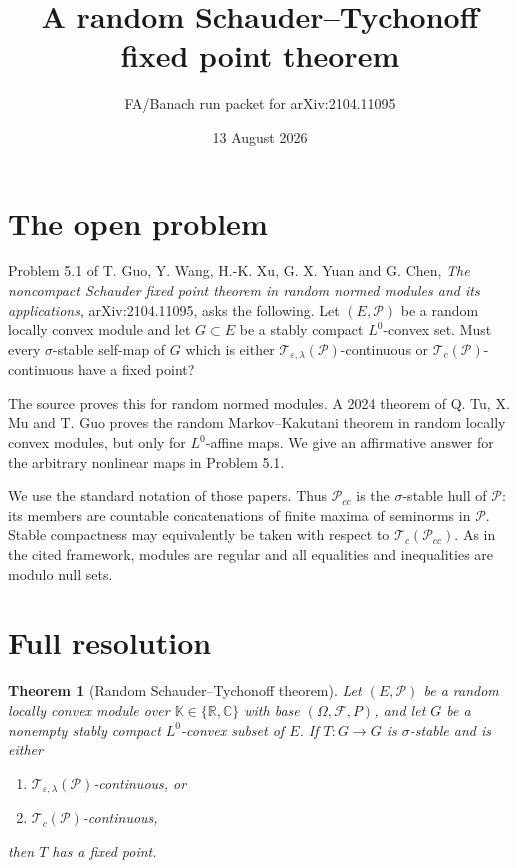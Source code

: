 \documentclass[11pt]{article}
\title{A random Schauder--Tychonoff fixed point theorem}
\author{FA/Banach run packet for arXiv:2104.11095}
\date{13 August 2026}
\newtheorem{theorem}{Theorem}
\newcommand{\Tc}{\mathcal T_c}
\newcommand{\Tel}{\mathcal T_{\varepsilon,\lambda}}
\newcommand{\Pcc}{\mathcal P_{cc}}
\begin{document}
\setlength{\emergencystretch}{3em}
\maketitle

\section*{The open problem}

Problem 5.1 of T. Guo, Y. Wang, H.-K. Xu, G. X. Yuan and G. Chen,
\emph{The noncompact Schauder fixed point theorem in random normed modules
and its applications}, arXiv:2104.11095, asks the following.  Let
$(E,\mathcal P)$ be a random locally convex module and let $G\subset E$ be
a stably compact $L^0$-convex set.  Must every $\sigma$-stable self-map of
$G$ which is either $\Tel(\mathcal P)$-continuous or
$\Tc(\mathcal P)$-continuous have a fixed point?

The source proves this for random normed modules.  A 2024 theorem of Q. Tu,
X. Mu and T. Guo proves the random Markov--Kakutani theorem in random
locally convex modules, but only for $L^0$-affine maps.  We give an
affirmative answer for the arbitrary nonlinear maps in Problem 5.1.

We use the standard notation of those papers.  Thus $\Pcc$ is the
$\sigma$-stable hull of $\mathcal P$: its members are countable
concatenations of finite maxima of seminorms in $\mathcal P$.  Stable
compactness may equivalently be taken with respect to
$\Tc(\Pcc)$.  As in the cited framework, modules are regular and all
equalities and inequalities are modulo null sets.

\section*{Full resolution}

\begin{theorem}[Random Schauder--Tychonoff theorem]\label{thm:main}
Let $(E,\mathcal P)$ be a random locally convex module over
$\mathbb K\in\{\mathbb R,\mathbb C\}$ with base $(\Omega,\mathcal F,P)$,
and let $G$ be a nonempty stably compact $L^0$-convex subset of $E$.
If $T:G\to G$ is $\sigma$-stable and is either
\begin{enumerate}[label=(\roman*),leftmargin=2.1em,nosep]
\item $\Tel(\mathcal P)$-continuous, or
\item $\Tc(\mathcal P)$-continuous,
\end{enumerate}
then $T$ has a fixed point.
\end{theorem}
\end{document}
